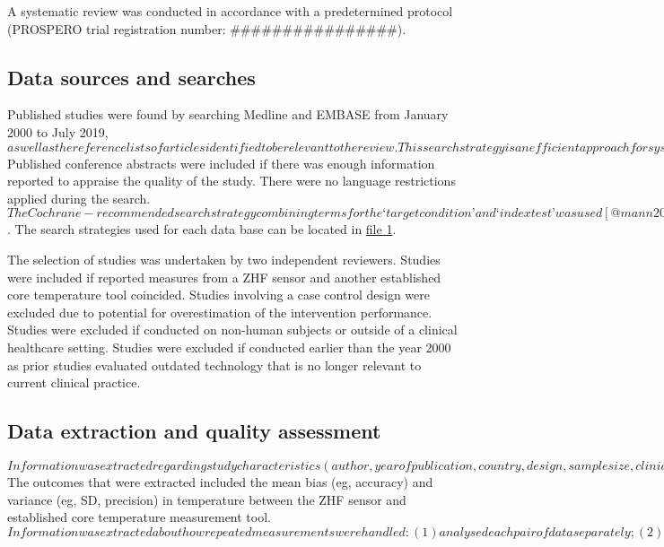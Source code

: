 \documentclass[smallextended]{svjour3}       %
\begin{document}
A systematic review was conducted in accordance with a predetermined
protocol (PROSPERO trial registration number:
\#\#\#\#\#\#\#\#\#\#\#\#\#\#\#\#).

\hypertarget{data-sources-and-searches}{%
\subsection{Data sources and searches}\label{data-sources-and-searches}}

Published studies were found by searching Medline and EMBASE from
January 2000 to July 2019,
\(as well as the reference lists of articles identified to be relevant to the review. This search strategy is an efficient approach for systematic reviews of diagnostic test accuracy studies [@preston2015improving]. Unpublished and ongoing studies were located by searching the International Clinical Trials Platform.\)
Published conference abstracts were included if there was enough
information reported to appraise the quality of the study. There were no
language restrictions applied during the search.
\(The Cochrane-recommended search strategy combining terms for the ‘target condition’ and ‘index test’ was used [@mann2012should]\).
The search strategies used for each data base can be located in
\href{}{file 1}.

The selection of studies was undertaken by two independent reviewers.
Studies were included if reported measures from a ZHF sensor and another
established core temperature tool coincided. Studies involving a case
control design were excluded due to potential for overestimation of the
intervention performance. Studies were excluded if conducted on
non-human subjects or outside of a clinical healthcare setting. Studies
were excluded if conducted earlier than the year 2000 as prior studies
evaluated outdated technology that is no longer relevant to current
clinical practice.

\hypertarget{data-extraction-and-quality-assessment}{%
\subsection{Data extraction and quality
assessment}\label{data-extraction-and-quality-assessment}}

\(Information was extracted regarding study characteristics(author, year of publication, country, design, sample size, clinical setting, numbers studied and analyses for each outcome), population characteristics (inclusion and exclusion criteria) and ZHF characteristics (timing and methods of measurements, and methods of calibration).\)
The outcomes that were extracted included the mean bias (eg, accuracy)
and variance (eg, SD, precision) in temperature between the ZHF sensor
and established core temperature measurement tool.
\(Information was extracted about how repeated measurements were handled: (1) analysed each pair of data separately; (2) treated each pair of data as independent; or (3) used either analysis of variance or a random effects model as a way to control for the dependent nature of the repeated measures data [@myles2007using].\)
\end{document}
